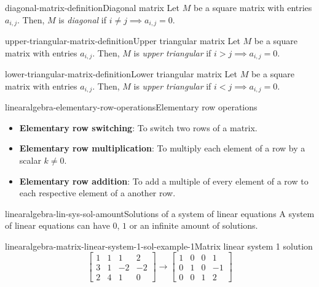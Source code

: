 \documentclass[preview]{standalone}
\begin{document}
\begin{snippetdefinition}{diagonal-matrix-definition}{Diagonal matrix}
    Let \(M\) be a square matrix with entries \(a_{i,j}\).
    Then, \(M\) is \textit{diagonal} if \(i \neq j \implies a_{i,j} = 0\). 
\end{snippetdefinition}

\begin{snippetdefinition}{upper-triangular-matrix-definition}{Upper triangular matrix}
    Let \(M\) be a square matrix with entries \(a_{i,j}\).
    Then, \(M\) is \textit{upper triangular} if \(i > j \implies a_{i,j} = 0\). 
\end{snippetdefinition}

\begin{snippetdefinition}{lower-triangular-matrix-definition}{Lower triangular matrix}
    Let \(M\) be a square matrix with entries \(a_{i,j}\).
    Then, \(M\) is \textit{upper triangular} if \(i < j \implies a_{i,j} = 0\). 
\end{snippetdefinition}

\begin{snippetdefinition}{linearalgebra-elementary-row-operations}{Elementary row operations}
    \begin{itemize}
        \item \textbf{Elementary row switching}:
        To switch two rows of a matrix.
        \item \textbf{Elementary row multiplication}:
        To multiply each element of a row by
        a scalar \(k \neq 0\).
        \item \textbf{Elementary row addition}:
        To add a multiple of every element of a row
        to each respective element of a another row.
    \end{itemize}

\end{snippetdefinition}

\begin{snippetproposition}{linearalgebra-lin-sys-sol-amount}{Solutions of a system of linear equations}
    A system of linear equations can have \(0\), \(1\)
    or an infinite amount of solutions.
\end{snippetproposition}

\begin{snippetexample}{linearalgebra-matrix-linear-system-1-sol-example-1}{Matrix linear system 1 solution}
    \[
        \begin{bmatrix}
            1 & 1 & 1 & 2 \\
            3 & 1 & -2 & -2 \\
            2 & 4 & 1 & 0
        \end{bmatrix}
        \rightarrow
        \begin{bmatrix}
            1 & 0 & 0 & 1 \\
            0 & 1 & 0 & -1 \\
            0 & 0 & 1 & 2
        \end{bmatrix}
    \]
\end{snippetexample}
\end{document}
